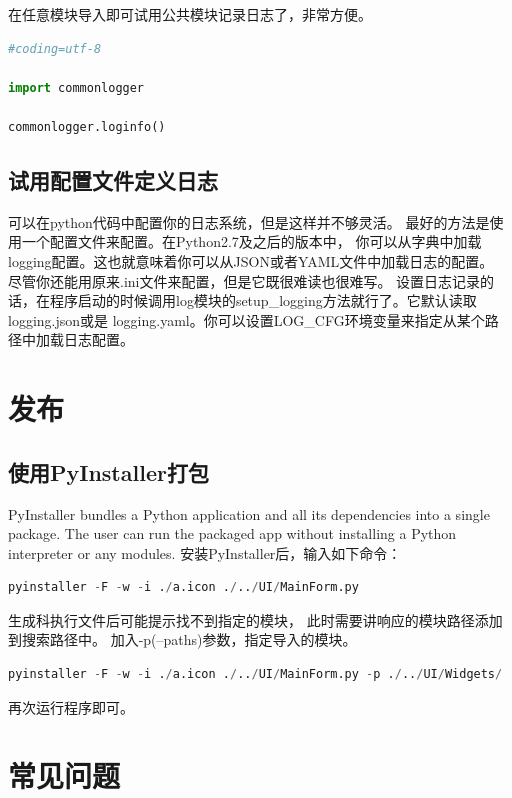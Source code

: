 \documentclass{book}
\begin{document}
在任意模块导入即可试用公共模块记录日志了，非常方便。

\begin{lstlisting}[language=Python]
#coding=utf-8

import commonlogger

commonlogger.loginfo()
\end{lstlisting}

\subsection{试用配置文件定义日志}

可以在python代码中配置你的日志系统，但是这样并不够灵活。
最好的方法是使用一个配置文件来配置。在Python2.7及之后的版本中，
你可以从字典中加载logging配置。这也就意味着你可以从JSON或者YAML文件中加载日志的配置。
尽管你还能用原来.ini文件来配置，但是它既很难读也很难写。
设置日志记录的话，在程序启动的时候调用log模块的setup\_logging方法就行了。它默认读取logging.json或是 logging.yaml。你可以设置LOG\_CFG环境变量来指定从某个路径中加载日志配置。

\section{发布}

\subsection{使用PyInstaller打包}

PyInstaller bundles a Python application and all its dependencies into a single package. 
The user can run the packaged app without installing a Python interpreter or any modules.
安装PyInstaller后，输入如下命令：

\begin{lstlisting}[language=Python]
pyinstaller -F -w -i ./a.icon ./../UI/MainForm.py
\end{lstlisting}

生成科执行文件后可能提示找不到指定的模块，
此时需要讲响应的模块路径添加到搜索路径中。
加入-p(--paths)参数，指定导入的模块。

\begin{lstlisting}[language=Python]
pyinstaller -F -w -i ./a.icon ./../UI/MainForm.py -p ./../UI/Widgets/
\end{lstlisting}

再次运行程序即可。

\section{常见问题}
\end{document}
